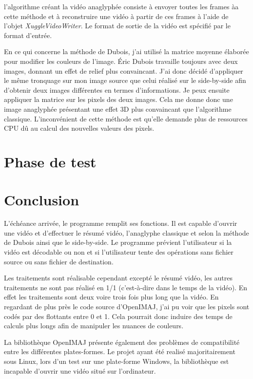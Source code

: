 \documentclass[10pt,a4paper]{article}
\begin{document}
l'algorithme créant la vidéo anaglyphée consiste à envoyer toutes les frames àa cette méthode et à reconstruire une vidéo à partir de ces frames à l'aide de l'objet
\textit{XuggleVideoWriter}. Le format de sortie de la vidéo est spécifié par le format d'entrée.

En ce qui concerne la méthode de Dubois, j'ai utilisé la matrice moyenne élaborée pour modifier les couleurs de l'image. Éric Dubois travaille toujours avec deux images, donnant un effet de relief plus
convaincant. J'ai donc décidé d'appliquer le même tronquage sur mon image source que celui réalisé sur le side-by-side afin d'obtenir deux images différentes en termes d'informations. Je peux ensuite
appliquer la matrice sur les pixels des deux images. Cela me donne donc une image anaglyphée présentant une effet 3D plus convaincant que l'algorithme classique. L'inconvénient de cette méthode est qu'elle demande plus de ressources CPU dû au calcul des nouvelles valeurs des pixels.

\section{Phase de test}

\section{Conclusion}

L'échéance arrivée, le programme remplit ses fonctions. Il est capable d'ouvrir une vidéo et d'effectuer le résumé vidéo, l'anaglyphe classique et selon la méthode de Dubois ainsi que le side-by-side. Le programme prévient l'utilisateur si la vidéo est décodable ou non et si l'utilisateur tente des opérations sans fichier source ou sans fichier de destination.

Les traitements sont réalisable cependant excepté le résumé vidéo, les autres traitements ne sont pas réalisé en 1/1 (c'est-à-dire dans le temps de la vidéo). En effet les traitements sont deux voire trois fois plus long que la vidéo. En regardant de plus près le code source d'OpenIMAJ, j'ai pu voir que les pixels sont codés par des flottants entre  0 et 1. Cela pourrait donc induire des temps de calculs plus longs afin de manipuler les nuances de couleurs.

La bibliothèque OpenIMAJ présente également des problèmes de compatibilité entre les différentes plates-formes. Le projet ayant été realisé majoritairement sous Linux, lors d'un test sur une plate-forme Windows, la bibliothèque est incapable d'ouvrir une vidéo situé sur l'ordinateur.
\end{document}
